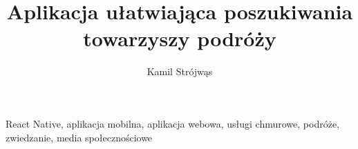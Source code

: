 \documentclass[
    left=2.5cm,         %
    right=2.5cm,        %
    top=2.5cm,          %
    bottom=3cm,         %
    bindingoffset=6mm,  %
    nohyphenation=false %
]{eiti/eiti-thesis}
\begin{document}
\EngineerThesis %
{}
\title{
    Aplikacja ułatwiająca poszukiwania towarzyszy podróży
}
\author{Kamil Strójwąs}
\date{\the\year}
\maketitle

\cleardoublepage %
\streszczenie 
\slowakluczowe React Native, aplikacja mobilna, aplikacja webowa, usługi chmurowe, podróże, zwiedzanie, media społecznościowe



\cleardoublepage %
\tableofcontents

\cleardoublepage %
\pagestyle{headings}










\cleardoublepage
\printbibliography

\newpage
\pagestyle{plain}
\end{document}

